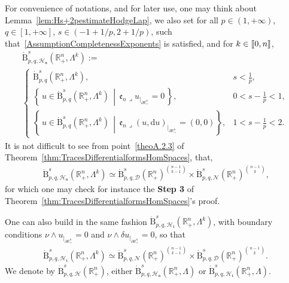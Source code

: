 \documentclass[10pt]{amsart}
\theoremstyle{definition}\newtheorem{defi}[theo]{Definition}\newtheorem{rema}[theo]{Remark}\newtheorem{exam}[theo]{Example}\newtheorem{exem}[theo]{Example}\newtheorem{nota}[theo]{Notation}
\newcommand{\bbR}{\mathbb{R}}
\newcommand{\rmB}{\mathrm{B}}
\newcommand{\rmd}{\mathrm{d}}
\newcommand{\clH}{\mathcal{H}}
\newcommand{\clN}{\mathcal{N}}
\newcommand{\clD}{\mathcal{D}}
\newcommand{\fkn}{\mathfrak{n}}
\newcommand{\fke}{\mathfrak{e}}
\newcommand{\fkt}{\mathfrak{t}}
\newcommand{\llbracket}{\mathopen{[\mkern -2.7mu[}}
\newcommand{\rrbracket}{\mathclose{]\mkern -2.7mu]}}
\newcommand{\llb}{\llbracket}
\newcommand{\rrb}{\rrbracket}
\newcommand{\iprod}{\mathbin{\lrcorner}}
\begin{document}
For convenience of notations, and for later use, one may think about Lemma~\ref{lem:Hs+2pestimateHodgeLap}, we also set for all $p\in(1,+\infty)$, $q\in[1,+\infty]$, $s\in(-1+1/p,2+1/p)$, such that~\eqref{AssumptionCompletenessExponents} is satisfied, and for $k\in\llb 0,n\rrb$,
\begin{multline}\label{eq:defhomBesovwithCompCond}
\dot{\rmB}^{s}_{p,q,\clH_\fkn}\left(\bbR^n_+,\Lambda^k\right):=\\
\begin{cases}
\dot{\rmB}^{s}_{p,q}\left(\bbR^n_+,\Lambda^k\right),  & s < \frac{1}{p},\\
\left\{ \,u\in \dot{\rmB}^{s}_{p,q}\left(\bbR^n_+,\Lambda^k\right)\, \middle|\, \fke _n\iprod u_{|_{\partial\bbR^n_+}}=0 \,\right\}, & 0< s -\frac{1}{p} < 1,\\[0.70em]
\left\{ \,u\in \dot{\rmB}^{s}_{p,q}\left(\bbR^n_+,\Lambda^k\right)\, \middle|\, \fke _n\iprod (u,\rmd u)_{|_{\partial\bbR^n_+}}=(0,0)\right\}, &1 < s -\frac{1}{p} < 2.
\end{cases}
\end{multline}
It is not difficult to see from point~\eqref{theoA.2.3} of Theorem~\ref{thm:TracesDifferentialformsHomSpaces}, that,
\begin{align*}
\dot{\rmB}^{s}_{p,q,\clH_\fkn}(\bbR^n_+,\Lambda^k) \simeq \dot{\rmB}^{s}_{p,q,\clD}(\bbR^n_+)^{\binom{n-1}{k-1}}\times\dot{\rmB}^{s}_{p,q,\clN}(\bbR^n_+)^{\binom{n-1}{k}} \text{,}
\end{align*}
for which one may check for instance the \textbf{Step 3} of Theorem~\ref{thm:TracesDifferentialformsHomSpaces}'s proof.

One can also build in the same fashion $\dot{\rmB}^{s}_{p,q,\clH_\fkt}(\bbR^n_+,\Lambda^k)$, with boundary conditions $\nu\wedge u_{|_{\partial\bbR^n_+}}=0$ and $\nu\wedge \delta u_{|_{\partial\bbR^n_+}}=0$, so that
\begin{align*}
\dot{\rmB}^{s}_{p,q,\clH_\fkt}\left(\bbR^n_+,\Lambda^k\right) \simeq \dot{\rmB}^{s}_{p,q,\clN}\left(\bbR^n_+\right)^{\binom{n-1}{k-1}}\times\dot{\rmB}^{s}_{p,q,\clD}\left(\bbR^n_+\right)^{\binom{n-1}{k}} .
\end{align*}
We denote by $\dot{\rmB}^{s}_{p,q,\clH}(\bbR^n_+)$, either $\dot{\rmB}^{s}_{p,q,\clH_\fkn}(\bbR^n_+,\Lambda)$ or $\dot{\rmB}^{s}_{p,q,\clH_\fkt}(\bbR^n_+,\Lambda)$.
\end{document}

